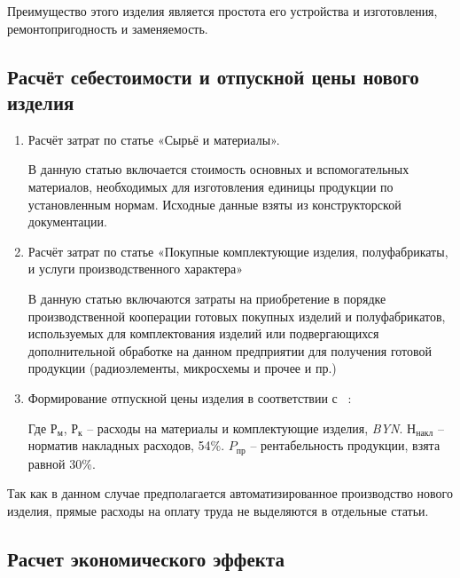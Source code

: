 
Преимущество этого изделия является простота его устройства и
изготовления, ремонтопригодность и заменяемость.

\subsection{Расчёт себестоимости и отпускной цены нового изделия}

\begin{enumerate}
\item Расчёт затрат по статье «Сырьё и материалы».

  В данную статью включается стоимость основных и вспомогательных
  материалов, необходимых для изготовления единицы продукции по
  установленным нормам. Исходные данные взяты из конструкторской
  документации.
  
  

\item Расчёт затрат по статье «Покупные комплектующие изделия,
  полуфабрикаты, и услуги производственного характера»

  В данную статью включаются затраты на приобретение в порядке
  производственной кооперации готовых покупных изделий и полуфабрикатов,
  используемых для комплектования изделий или подвергающихся
  дополнительной обработке на данном предприятии для получения готовой
  продукции (радиоэлементы, микросхемы и прочее и пр.)

  

\item Формирование отпускной цены изделия в соответствии с ~\cite{bsuir-project-economics}:

  

  Где $Р_м$, $Р_к$ – расходы на материалы и комплектующие изделия, \textit{BYN}.
  $Н_{накл}$ – норматив накладных расходов, 54\%.
  $P_{пр}$ – рентабельность продукции, взята равной 30\%.
\end{enumerate}

Так как в данном случае предполагается автоматизированное производство
нового изделия, прямые расходы на оплату труда не выделяются в
отдельные статьи.

\subsection{Расчет экономического эффекта}

